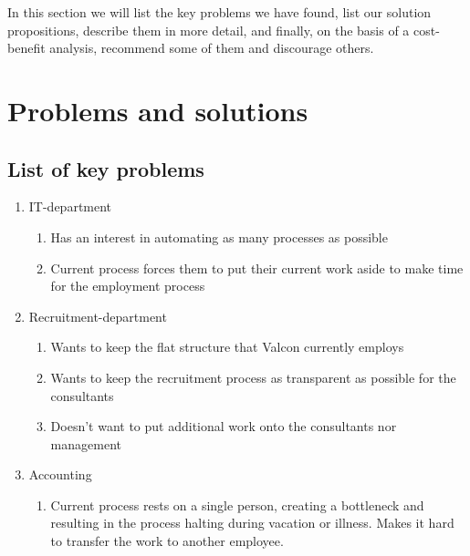 In this section we will list the key problems we have found, list our solution propositions, describe them in more detail, and finally, on the basis of a cost-benefit analysis, recommend some of them and discourage others.

\section{Problems and solutions}
\subsection{List of key problems}
\begin{enumerate}
\item IT-department
	\begin{enumerate}
	\item Has an interest in automating as many processes as possible
	\item Current process forces them to put their current work aside to make time for the employment process
	\end{enumerate}
\item Recruitment-department
	\begin{enumerate}
	\item Wants to keep the flat structure that Valcon currently employs
	\item Wants to keep the recruitment process as transparent as possible for the consultants
	\item Doesn't want to put additional work onto the consultants nor management
	\end{enumerate}
\item Accounting
	\begin{enumerate}
	\item Current process rests on a single person, creating a bottleneck and resulting in the process halting during vacation or illness. Makes it hard to transfer the work to another employee.
	\end{enumerate}

\end{enumerate}

